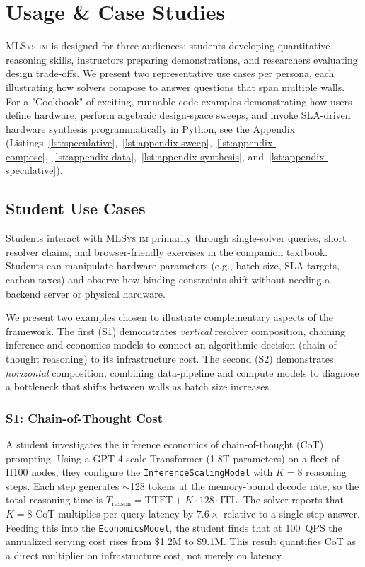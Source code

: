 \documentclass[10pt,twocolumn]{article}
\newcommand{\mlsysim}{\mbox{\textsc{MLSys}\,\textperiodcentered\,\textsc{im}}\xspace}
\begin{document}
\section{Usage \& Case Studies}
\label{sec:usage}

\mlsysim is designed for three audiences: students developing quantitative reasoning skills, instructors preparing demonstrations, and researchers evaluating design trade-offs. We present two representative use cases per persona, each illustrating how solvers compose to answer questions that span multiple walls. For a "Cookbook" of exciting, runnable code examples demonstrating how users define hardware, perform algebraic design-space sweeps, and invoke SLA-driven hardware synthesis programmatically in Python, see the Appendix (Listings~\ref{lst:speculative},~\ref{lst:appendix-sweep},~\ref{lst:appendix-compose},~\ref{lst:appendix-data},~\ref{lst:appendix-synthesis}, and~\ref{lst:appendix-speculative}).

\subsection{Student Use Cases}

Students interact with \mlsysim primarily through single-solver queries, short resolver chains, and browser-friendly exercises in the companion textbook. Students can manipulate hardware parameters (e.g., batch size, SLA targets, carbon taxes) and observe how binding constraints shift without needing a backend server or physical hardware.

We present two examples chosen to illustrate complementary aspects of the framework. The first (S1) demonstrates \emph{vertical} resolver composition, chaining inference and economics models to connect an algorithmic decision (chain-of-thought reasoning) to its infrastructure cost. The second (S2) demonstrates \emph{horizontal} composition, combining data-pipeline and compute models to diagnose a bottleneck that shifts between walls as batch size increases.

\subsubsection{S1: Chain-of-Thought Cost}
A student investigates the inference economics of chain-of-thought (CoT) prompting. Using a GPT-4-scale Transformer (1.8T parameters) on a fleet of H100 nodes, they configure the \texttt{InferenceScalingModel} with $K{=}8$ reasoning steps. Each step generates $\sim$128 tokens at the memory-bound decode rate, so the total reasoning time is $T_{\text{reason}} = \text{TTFT} + K \cdot 128 \cdot \text{ITL}$. The solver reports that $K{=}8$ CoT multiplies per-query latency by $7.6{\times}$ relative to a single-step answer. Feeding this into the \texttt{EconomicsModel}, the student finds that at 100~QPS the annualized serving cost rises from \$1.2M to \$9.1M. This result quantifies CoT as a direct multiplier on infrastructure cost, not merely on latency.
\end{document}
